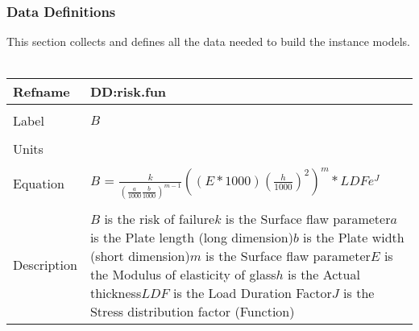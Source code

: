 \documentclass[12pt]{article}
\begin{document}
\subsubsection{Data Definitions}
\label{Sec:DDs}
This section collects and defines all the data needed to build the instance models.
~\newline
\noindent \begin{minipage}{\textwidth}
\begin{tabular}{p{} p{}}
\toprule \textbf{Refname} & \textbf{DD:risk.fun}
\label{DD:risk.fun}
\\ \midrule \\
Label & $B$
\\ \midrule \\
Units & 
\\ \midrule \\
Equation & $B$ = $\frac{k}{(\frac{a}{1000}\frac{b}{1000})^{m-1}}((E*1000)(\frac{h}{1000})^{2})^{m}*LDFe^{J}$
\\ \midrule \\
Description & $B$ is the risk of failure\newline$k$ is the Surface flaw parameter\newline$a$ is the Plate length (long dimension)\newline$b$ is the Plate width (short dimension)\newline$m$ is the Surface flaw parameter\newline$E$ is the Modulus of elasticity of glass\newline$h$ is the Actual thickness\newline$LDF$ is the Load Duration Factor\newline$J$ is the Stress distribution factor (Function)
\\ \bottomrule \end{tabular}
\end{minipage}\\
~\newline
\end{document}
